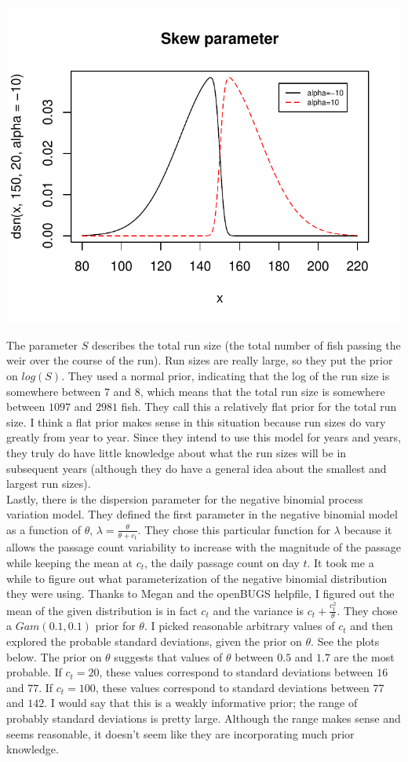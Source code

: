 \documentclass[12pt]{article}\usepackage[]{graphicx}\usepackage[]{color}
\newenvironment{knitrout}{}{} %
\begin{document}
\begin{doublespacing}
\begin{enumerate}
\begin{center}
\begin{knitrout}\footnotesize
{}\color{fgcolor}
\includegraphics[width=.5\linewidth]{figure/dsn-1} 

\end{knitrout}
\end{center}

\noindent The parameter $S$ describes the total run size (the total number of fish passing the weir over the course of the run). Run sizes are really large, so they put the prior on $log(S)$. They used a normal prior, indicating that the log of the run size is somewhere between $7$ and $8$, which means that the total run size is somewhere between $1097$ and $2981$ fish. They call this a relatively flat prior for the total run size. I think a flat prior makes sense in this situation because run sizes do vary greatly from year to year. Since they intend to use this model for years and years, they truly do have little knowledge about what the run sizes will be in subsequent years (although they do have a general idea about the smallest and largest run sizes). \\

\noindent Lastly, there is the dispersion parameter for the negative binomial process variation model. They defined the first parameter in the negative binomial model as a function of $\theta$, $\lambda=\frac{\theta}{\theta+c_t}$. They chose this particular function for $\lambda$ because it allows the passage count variability to increase with the magnitude of the passage while keeping the mean at $c_t$, the daily passage count on day $t$. It took me a while to figure out what parameterization of the negative binomial distribution they were using. Thanks to Megan and the openBUGS helpfile, I figured out the mean of the given distribution is in fact $c_t$ and the variance is $c_t+\frac{c_t^2}{\theta}$. They chose a $Gam(0.1, 0.1)$ prior for $\theta$. I picked reasonable arbitrary values of $c_t$ and then explored the probable standard deviations, given the prior on $\theta$. See the plots below. The prior on $\theta$ suggests that values of $\theta$ between $0.5$ and $1.7$ are the most probable. If $c_t=20$, these values correspond to standard deviations between $16$ and $77$. If $c_t=100$, these values correspond to standard deviations between $77$ and $142$. I would say that this is a weakly informative prior; the range of probably standard deviations is pretty large. Although the range makes sense and seems reasonable, it doesn't seem like they are incorporating much prior knowledge.


\end{enumerate}
\end{doublespacing}
\end{document}
